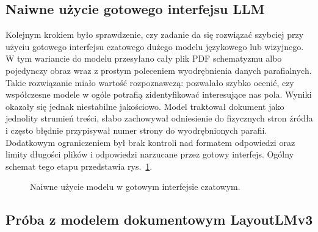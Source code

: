 \subsection{Naiwne użycie gotowego interfejsu LLM}\label{subsec:proby_calodokumentowe}

Kolejnym krokiem było sprawdzenie, czy zadanie da się rozwiązać szybciej przy użyciu gotowego interfejsu czatowego dużego modelu językowego lub wizyjnego.
W tym wariancie do modelu przesyłano cały plik PDF schematyzmu albo pojedynczy obraz wraz z prostym poleceniem wyodrębnienia danych parafialnych.
Takie rozwiązanie miało wartość rozpoznawczą: pozwalało szybko ocenić, czy współczesne modele w ogóle potrafią zidentyfikować interesujące nas pola.
Wyniki okazały się jednak niestabilne jakościowo.
Model traktował dokument jako jednolity strumień treści, słabo zachowywał odniesienie do fizycznych stron źródła i często błędnie przypisywał numer strony do wyodrębnionych parafii.
Dodatkowym ograniczeniem był brak kontroli nad formatem odpowiedzi oraz limity długości plików i odpowiedzi narzucane przez gotowy interfejs.
Ogólny schemat tego etapu przedstawia rys.~\ref{fig:naive-llm-approach}.

\begin{figure}[htbp]
\centering
{}
\caption{Naiwne użycie modelu w gotowym interfejsie czatowym.}
\label{fig:naive-llm-approach}
\end{figure}

\subsection{Próba z modelem dokumentowym LayoutLMv3}\label{subsec:layoutlmv3_attempt}

